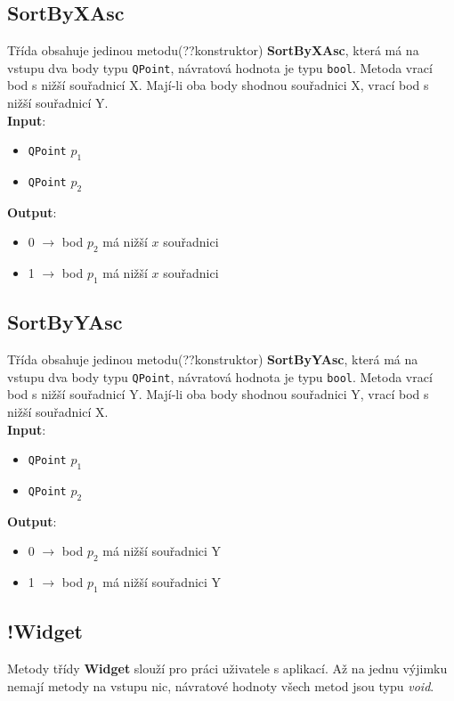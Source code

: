 \documentclass[a4paper, 12pt]{article}
\begin{document}
\subsection{SortByXAsc}
Třída obsahuje jedinou metodu(??konstruktor) \textbf{SortByXAsc}, která má na vstupu dva body typu \texttt{QPoint}, návratová hodnota je typu \texttt{bool}. Metoda vrací bod s nižší  souřadnicí X. Mají-li oba body shodnou souřadnici X, vrací bod s nižší souřadnicí Y.\\

\textbf{Input}:
\begin{itemize}
\item \texttt{QPoint} $p_1$
\item \texttt{QPoint} $p_2$
\end{itemize}

\textbf{Output}:
\begin{itemize}
\item 0 $\rightarrow$ bod $p_2$ má nižší $x$ souřadnici
\item 1 $\rightarrow$ bod $p_1$ má nižší $x$ souřadnici
\end{itemize}

\subsection{SortByYAsc}
Třída obsahuje jedinou metodu(??konstruktor) \textbf{SortByYAsc}, která má na vstupu dva body typu \texttt{QPoint}, návratová hodnota je typu \texttt{bool}. Metoda vrací bod s nižší  souřadnicí Y. Mají-li oba body shodnou souřadnici Y, vrací bod s nižší souřadnicí X.\\

\textbf{Input}:
\begin{itemize}
\item \texttt{QPoint} $p_1$
\item \texttt{QPoint} $p_2$
\end{itemize}

\textbf{Output}:
\begin{itemize}
\item 0 $\rightarrow$ bod $p_2$ má nižší souřadnici Y
\item 1 $\rightarrow$ bod $p_1$ má nižší souřadnici Y
\end{itemize}

\subsection{!Widget}
Metody třídy \textbf{Widget} slouží pro práci uživatele s aplikací. Až na jednu výjimku nemají metody na vstupu nic, návratové hodnoty všech metod jsou typu \textsl{void}.
\end{document}
